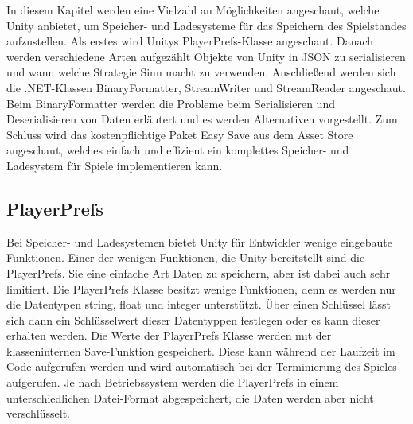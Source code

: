 In diesem Kapitel werden eine Vielzahl an Möglichkeiten angeschaut, welche Unity anbietet, um Speicher- und Ladesysteme für das Speichern des Spielstandes aufzustellen. Als erstes wird Unitys PlayerPrefs-Klasse angeschaut. Danach werden verschiedene Arten aufgezählt Objekte von Unity in JSON zu serialisieren und wann welche Strategie Sinn macht zu verwenden. Anschließend werden sich die .NET-Klassen BinaryFormatter, StreamWriter und StreamReader angeschaut. Beim BinaryFormatter werden die Probleme beim Serialisieren und Deserialisieren von Daten erläutert und es werden Alternativen vorgestellt. Zum Schluss wird das kostenpflichtige Paket Easy Save aus dem Asset Store angeschaut, welches einfach und effizient ein komplettes Speicher- und Ladesystem für Spiele implementieren kann.

\subsection{PlayerPrefs}
Bei Speicher- und Ladesystemen bietet Unity für Entwickler wenige eingebaute Funktionen. Einer der wenigen Funktionen, die Unity bereitstellt sind die PlayerPrefs. Sie eine einfache Art Daten zu speichern, aber ist dabei auch sehr limitiert. Die PlayerPrefs Klasse besitzt wenige Funktionen, denn es werden nur die Datentypen string, float und integer unterstützt. Über einen Schlüssel lässt sich dann ein Schlüsselwert dieser Datentyppen festlegen oder es kann dieser erhalten werden. Die Werte der PlayerPrefs Klasse werden mit der klasseninternen Save-Funktion gespeichert. Diese kann während der Laufzeit im Code aufgerufen werden und wird automatisch bei der Terminierung des Spieles aufgerufen.\cite{unityPlayerPrefsSave} Je nach Betriebssystem werden die PlayerPrefs in einem unterschiedlichen Datei-Format abgespeichert, die Daten werden aber nicht verschlüsselt.
\cite{unityPlayerPrefs}

